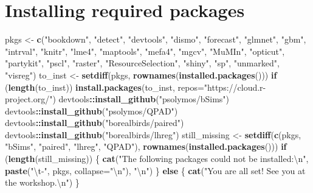 \documentclass[12pt,]{book}
\newenvironment{Shaded}{\begin{snugshade}}{\end{snugshade}}
\newcommand{\CharTok}[1]{\textcolor[rgb]{0.31,0.60,0.02}{#1}}
\newcommand{\ControlFlowTok}[1]{\textcolor[rgb]{0.13,0.29,0.53}{\textbf{#1}}}
\newcommand{\DataTypeTok}[1]{\textcolor[rgb]{0.13,0.29,0.53}{#1}}
\newcommand{\KeywordTok}[1]{\textcolor[rgb]{0.13,0.29,0.53}{\textbf{#1}}}
\newcommand{\NormalTok}[1]{#1}
\newcommand{\OperatorTok}[1]{\textcolor[rgb]{0.81,0.36,0.00}{\textbf{#1}}}
\newcommand{\StringTok}[1]{\textcolor[rgb]{0.31,0.60,0.02}{#1}}
\begin{document}
\hypertarget{installing-required-packages}{%
\section*{Installing required packages}\label{installing-required-packages}}

\begin{Shaded}
\begin{Highlighting}[]
\NormalTok{pkgs <-}\StringTok{ }\KeywordTok{c}\NormalTok{(}\StringTok{"bookdown"}\NormalTok{, }\StringTok{"detect"}\NormalTok{, }\StringTok{"devtools"}\NormalTok{, }\StringTok{"dismo"}\NormalTok{, }\StringTok{"forecast"}\NormalTok{, }
  \StringTok{"glmnet"}\NormalTok{, }\StringTok{"gbm"}\NormalTok{, }\StringTok{"intrval"}\NormalTok{, }\StringTok{"knitr"}\NormalTok{, }\StringTok{"lme4"}\NormalTok{, }\StringTok{"maptools"}\NormalTok{, }\StringTok{"mefa4"}\NormalTok{, }
  \StringTok{"mgcv"}\NormalTok{, }\StringTok{"MuMIn"}\NormalTok{, }\StringTok{"opticut"}\NormalTok{, }\StringTok{"partykit"}\NormalTok{, }\StringTok{"pscl"}\NormalTok{, }\StringTok{"raster"}\NormalTok{, }
  \StringTok{"ResourceSelection"}\NormalTok{, }\StringTok{"shiny"}\NormalTok{, }\StringTok{"sp"}\NormalTok{, }\StringTok{"unmarked"}\NormalTok{, }\StringTok{"visreg"}\NormalTok{)}
\NormalTok{to_inst <-}\StringTok{ }\KeywordTok{setdiff}\NormalTok{(pkgs, }\KeywordTok{rownames}\NormalTok{(}\KeywordTok{installed.packages}\NormalTok{()))}
\ControlFlowTok{if}\NormalTok{ (}\KeywordTok{length}\NormalTok{(to_inst))}
  \KeywordTok{install.packages}\NormalTok{(to_inst, }\DataTypeTok{repos=}\StringTok{"https://cloud.r-project.org/"}\NormalTok{)}
\NormalTok{devtools}\OperatorTok{::}\KeywordTok{install_github}\NormalTok{(}\StringTok{"psolymos/bSims"}\NormalTok{)}
\NormalTok{devtools}\OperatorTok{::}\KeywordTok{install_github}\NormalTok{(}\StringTok{"psolymos/QPAD"}\NormalTok{)}
\NormalTok{devtools}\OperatorTok{::}\KeywordTok{install_github}\NormalTok{(}\StringTok{"borealbirds/paired"}\NormalTok{)}
\NormalTok{devtools}\OperatorTok{::}\KeywordTok{install_github}\NormalTok{(}\StringTok{"borealbirds/lhreg"}\NormalTok{)}
\NormalTok{still_missing <-}\StringTok{ }\KeywordTok{setdiff}\NormalTok{(}\KeywordTok{c}\NormalTok{(pkgs, }\StringTok{"bSims"}\NormalTok{, }\StringTok{"paired"}\NormalTok{, }\StringTok{"lhreg"}\NormalTok{, }\StringTok{"QPAD"}\NormalTok{), }
  \KeywordTok{rownames}\NormalTok{(}\KeywordTok{installed.packages}\NormalTok{()))}
\ControlFlowTok{if}\NormalTok{ (}\KeywordTok{length}\NormalTok{(still_missing)) \{}
  \KeywordTok{cat}\NormalTok{(}\StringTok{"The following packages could not be installed:}\CharTok{\textbackslash{}n}\StringTok{"}\NormalTok{,}
    \KeywordTok{paste}\NormalTok{(}\StringTok{"}\CharTok{\textbackslash{}t}\StringTok{-"}\NormalTok{, pkgs, }\DataTypeTok{collapse=}\StringTok{"}\CharTok{\textbackslash{}n}\StringTok{"}\NormalTok{), }\StringTok{"}\CharTok{\textbackslash{}n}\StringTok{"}\NormalTok{)}
\NormalTok{\} }\ControlFlowTok{else}\NormalTok{ \{}
  \KeywordTok{cat}\NormalTok{(}\StringTok{"You are all set! See you at the workshop.}\CharTok{\textbackslash{}n}\StringTok{"}\NormalTok{)}
\NormalTok{\}}
\end{Highlighting}
\end{Shaded}
\end{document}
